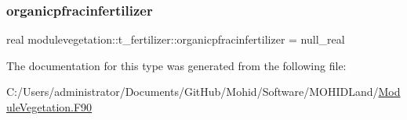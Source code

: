 \mbox{\label{structmodulevegetation_1_1t__fertilizer_a1657ef981bde74855e9bab7ec3fba63c}} 
\subsubsection{\texorpdfstring{organicpfracinfertilizer}{organicpfracinfertilizer}}
{\footnotesize\ttfamily real modulevegetation\+::t\+\_\+fertilizer\+::organicpfracinfertilizer = null\+\_\+real\hspace{0.3cm}{\ttfamily [private]}}



The documentation for this type was generated from the following file\+:\begin{DoxyCompactItemize}
\item 
C\+:/\+Users/administrator/\+Documents/\+Git\+Hub/\+Mohid/\+Software/\+M\+O\+H\+I\+D\+Land/\mbox{\hyperlink{_module_vegetation_8_f90}{Module\+Vegetation.\+F90}}\end{DoxyCompactItemize}
